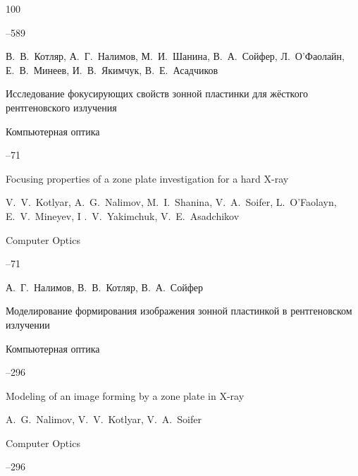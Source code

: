 \begin{thebibliography}{100}

--589




\by В.~В.~Котляр, А.~Г.~Налимов, М.~И.~Шанина, В.~А.~Сойфер, Л.~О'Фаолайн, Е.~В.~Минеев, И.~В.~Якимчук, В.~Е.~Асадчиков

\paper Исследование фокусирующих свойств зонной пластинки для жёсткого рентгеновского излучения

\jour Компьютерная оптика




--71

\misctransl

\paper Focusing properties of a zone plate investigation for a hard X-ray

\by V.~V.~Kotlyar, A.~G.~Nalimov, M.~I.~Shanina, V.~A.~Soifer, L.~O'Faolayn, E.~V.~Mineyev, I .~V.~Yakimchuk, V.~E.~Asadchikov

\jour Computer Optics




--71








\by А.~Г.~Налимов, В.~В.~Котляр, В.~А.~Сойфер

\paper Моделирование формирования изображения зонной пластинкой в рентгеновском излучении

\jour Компьютерная оптика




--296

\misctransl

\paper Modeling of an image forming by a zone plate in X-ray

\by A.~G.~Nalimov, V.~V.~Kotlyar, V.~A.~Soifer

\jour Computer Optics




--296






\end{thebibliography}
